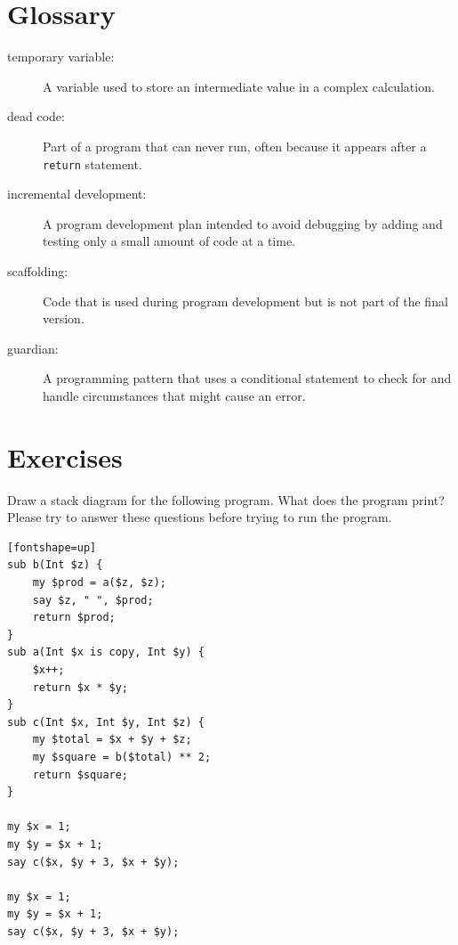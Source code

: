 \section{Glossary}

\begin{description}

\item[temporary variable:]  A variable used to store an intermediate value in
a complex calculation.

\item[dead code:]  Part of a program that can never run, often because
it appears after a {\tt return} statement.

\item[incremental development:]  A program development plan intended to
avoid debugging by adding and testing only
a small amount of code at a time.

\item[scaffolding:]  Code that is used during program development but is
not part of the final version.

\item[guardian:]  A programming pattern that uses a conditional
statement to check for and handle circumstances that
might cause an error.

\end{description}


\section{Exercises}

\begin{exercise}

Draw a stack diagram for the following program.  What does 
the program print? Please try to answer these questions before 
trying to run the program.

\begin{verbatim}[fontshape=up]
sub b(Int $z) {
    my $prod = a($z, $z);
    say $z, " ", $prod;
    return $prod;
}
sub a(Int $x is copy, Int $y) {
    $x++;
    return $x * $y;
}
sub c(Int $x, Int $y, Int $z) {
    my $total = $x + $y + $z;
    my $square = b($total) ** 2;
    return $square;
}

my $x = 1;
my $y = $x + 1;
say c($x, $y + 3, $x + $y);

my $x = 1;
my $y = $x + 1;
say c($x, $y + 3, $x + $y);
\end{verbatim}

\end{exercise}



